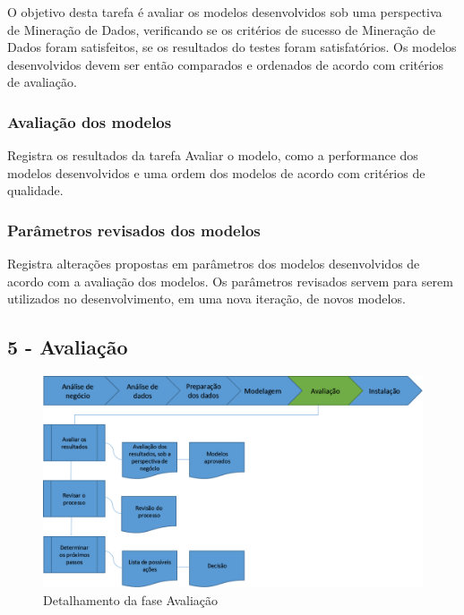O objetivo desta tarefa é avaliar os modelos desenvolvidos sob uma perspectiva de Mineração de Dados, verificando se os critérios de sucesso de Mineração de Dados foram satisfeitos, se os resultados do testes foram satisfatórios. Os modelos desenvolvidos devem ser então comparados e ordenados de acordo com critérios de avaliação.

\subsubsection*{Avaliação dos modelos}

Registra os resultados da tarefa Avaliar o modelo, como a performance dos modelos desenvolvidos e uma ordem dos modelos de acordo com critérios de qualidade.

\subsubsection*{Parâmetros revisados dos modelos}

Registra alterações propostas em parâmetros dos modelos desenvolvidos de acordo com a avaliação dos modelos. Os parâmetros revisados servem para serem utilizados no desenvolvimento, em uma nova iteração, de novos modelos.

\newpage 

\subsection*{5 - Avaliação}


\begin{figure}[H]
	\includegraphics[scale=0.8]{img/CRISP-DM-Avaliacao.png}
	\caption{Detalhamento da fase Avaliação}
	\label{img:CRISP-DM-Avaliacao}
\end{figure}

